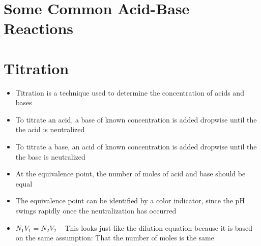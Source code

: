 \documentclass[12pt, openany, letterpaper]{memoir}
\begin{document}
\section{Some Common Acid-Base Reactions}

\section{Titration}
\begin{itemize}
	\item Titration is a technique used to determine the concentration of acids and bases
	\item To titrate an acid, a base of known concentration is added dropwise until the the acid is neutralized
	\item To titrate a base, an acid of known concentration is added dropwise until the the base is neutralized
	\item At the equivalence point, the number of moles of acid and base should be equal
	\item The equivalence point can be identified by a color indicator, since the pH swings rapidly once the neutralization has occurred
	\item $N_1V_1=N_2V_2$ -- This looks just like the dilution equation because it is based on the same assumption: That the number of moles is the same
\end{itemize}
\end{document}
